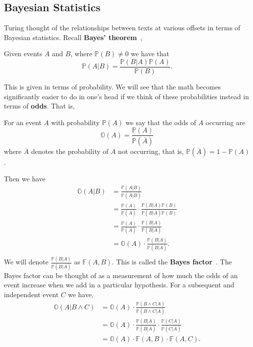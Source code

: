 \subsection{Bayesian Statistics}
Turing thought of the relationships between texts at various
offsets in terms of Bayesian statistics. Recall {\bf{Bayes' theorem}}~\cite[p.~175]{kendall1948advanced,},
\begin{theorem}
  Given events $A$ and $B$, where $\mathbb{P}(B) \ne 0$ we have that
  \[
    \mathbb{P}(A|B) = \frac{\mathbb{P}(B|A)\mathbb{P}(A)}{\mathbb{P}(B)}.
  \]
\end{theorem}
\noindent This is given in terms of probability. We will see that
the math becomes significantly easier to do in one's head if we
think of these probabilities instead in terms of {\bf{odds}}. That is,
\begin{definition}
  For an event $A$ with probability $\mathbb{P}(A)$ we say that the
  odds of $A$ occurring are
  \[
    \mathbb{O}(A) = \frac{\mathbb{P}(A)}{\mathbb{P}(\overline{A})}
  \]
  where $\overline{A}$ denotes the probability of $A$ not occurring,
  that is, $\mathbb{P}(\overline{A}) = 1-\mathbb{P}(A)$.
\end{definition}
\noindent Then we have
\begin{align*}
  \mathbb{O}(A|B) & =
  \frac{\mathbb{P}(A|B)}{\mathbb{P}(\overline{A}|B)}
  \\
  & =
  \frac{\mathbb{P}(A)}{\mathbb{P}(\overline{A})}\cdot\frac{\mathbb{P}(B|A)\mathbb{P}(B)}{\mathbb{P}(B|\overline{A})\mathbb{P}(B)}
  \\
  & =
  \frac{\mathbb{P}(A)}{\mathbb{P}(\overline{A})}\cdot\frac{\mathbb{P}(B|A)}{\mathbb{P}(B|\overline{A})}
  \\
  & =
  \mathbb{O}(A)\cdot\frac{\mathbb{P}(B|A)}{\mathbb{P}(B|\overline{A})}.
  \\
\end{align*}
\noindent We will denote
$\frac{\mathbb{P}(B|A)}{\mathbb{P}(B|\overline{A})}$ as
$\mathbb{F}(A,B)$. This is called the {\bf{Bayes factor}}~\cite[Section 3.1]{Hosgood2007}. The
Bayes factor can be thought of as a measurement of how much the
odds of an event increase when we add in a particular hypothesis.
For a subsequent and independent event $C$ we have,
\begin{align*}
  \mathbb{O}(A|B\wedge C) & =
  \mathbb{O}(A)\cdot\frac{\mathbb{P}(B\wedge C|
  A)}{\mathbb{P}(B\wedge C| \overline{A})}
  \\
  & = \mathbb{O}(A)\cdot\frac{\mathbb{P}(B| A)}{\mathbb{P}(B|
  \overline{A})}\cdot\frac{\mathbb{P}(C|A)}{\mathbb{P}(C|\overline{A})}
  \\
  & = \mathbb{O}(A)\cdot \mathbb{F}(A,B) \cdot \mathbb{F}(A,C).
\end{align*}
